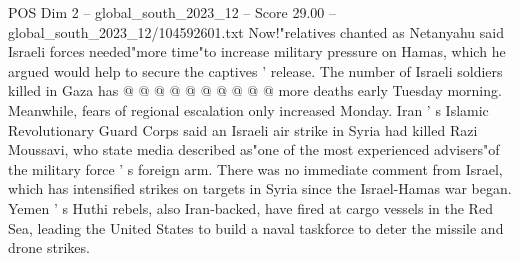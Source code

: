 \begin{textsample}{POS Dim 2 – global\_south\_2023\_12 – Score 29.00 – global\_south\_2023\_12/104592601.txt}
Now!"relatives chanted as Netanyahu said Israeli forces needed"more time"to increase military pressure on Hamas, which he argued would help to secure the captives ' release.
The number of Israeli soldiers killed in Gaza has @ @ @ @ @ @ @ @ @ @ more deaths early Tuesday morning.
Meanwhile, fears of regional escalation only increased Monday.
Iran ' s Islamic Revolutionary Guard Corps said an Israeli air strike in Syria had killed Razi Moussavi, who state media described as"one of the most experienced advisers"of the military force ' s foreign arm.
There was no immediate comment from Israel, which has intensified strikes on targets in Syria since the Israel-Hamas war began.
Yemen ' s Huthi rebels, also Iran-backed, have fired at cargo vessels in the Red Sea, leading the United States to build a naval taskforce to deter the missile and drone strikes.

\end{textsample}
